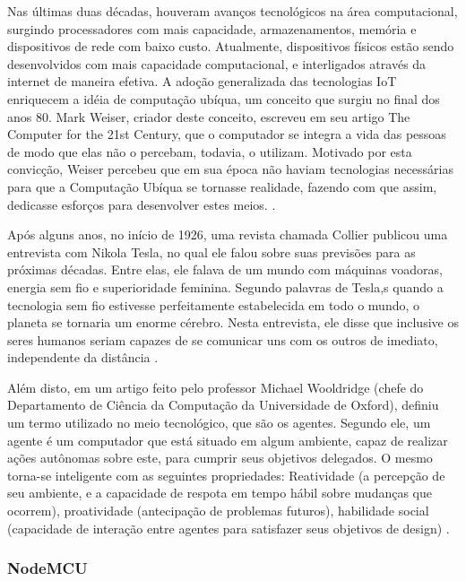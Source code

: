 \documentclass[journal]{IEEEtran}
\begin{document}
Nas últimas duas décadas, houveram avanços tecnológicos na área computacional, surgindo processadores com mais capacidade, armazenamentos, memória e dispositivos de rede com baixo custo. Atualmente, dispositivos físicos estão sendo desenvolvidos com mais capacidade computacional, e interligados através da internet de maneira efetiva. A adoção generalizada das tecnologias IoT enriquecem a idéia de computação ubíqua, um conceito que surgiu no final dos anos 80. Mark Weiser, criador deste conceito, escreveu em seu artigo The Computer for the 21st Century, que o computador se integra a vida das pessoas de modo que elas não o percebam, todavia, o utilizam. Motivado por esta convicção, Weiser percebeu que em sua época não haviam tecnologias necessárias para que a Computação Ubíqua se tornasse realidade, fazendo com que assim, dedicasse esforços para desenvolver estes meios. \cite{MarkWeiser}.

Após alguns anos, no início de 1926, uma revista chamada Collier publicou uma entrevista com Nikola Tesla, no qual ele falou sobre suas previsões para as próximas décadas. Entre elas, ele falava de um mundo com máquinas voadoras, energia sem fio e superioridade feminina. Segundo palavras de Tesla,s quando a tecnologia sem fio estivesse perfeitamente estabelecida em todo o mundo, o planeta se tornaria um enorme cérebro. Nesta entrevista, ele disse que inclusive os seres humanos seriam capazes de se comunicar uns com os outros de imediato, independente da distância \cite{johnBKennedy}.

Além disto, em um artigo feito pelo professor Michael Wooldridge (chefe do Departamento de Ciência da Computação da Universidade de Oxford), definiu um termo utilizado no meio tecnológico, que são os agentes. Segundo ele, um agente é um computador que está situado em algum ambiente, capaz de realizar ações autônomas sobre este, para cumprir seus objetivos delegados. O mesmo torna-se inteligente com as seguintes propriedades: Reatividade (a percepção de seu ambiente, e a capacidade de respota em tempo hábil sobre mudanças que ocorrem), proatividade (antecipação de problemas futuros), habilidade social (capacidade de interação entre agentes para satisfazer seus objetivos de design) \cite{MichaelWooldridge}.

\subsubsection{NodeMCU}
\end{document}
